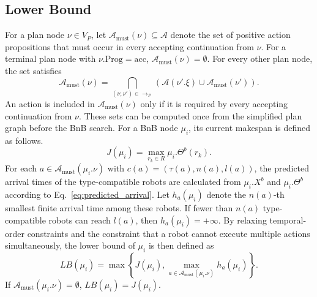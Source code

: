 \documentclass[lettersize,journal]{IEEEtran}
\theoremstyle{italiclemma}
\theoremstyle{italiclemma}
\theoremstyle{definition}
\begin{document}

\subsection{Lower Bound}

For a plan node $\nu\in V_P$, let
$\mathcal A_{\mathrm{must}}(\nu)\subseteq\mathcal A$ denote the set of positive action propositions that must occur in every accepting continuation from $\nu$. For a terminal plan node with $\nu.\mathrm{Prog}=\mathrm{acc}$,
$\mathcal A_{\mathrm{must}}(\nu)=\emptyset$. For every other plan node, the set satisfies
\begin{equation}
\mathcal A_{\mathrm{must}}(\nu) =
\bigcap_{(\nu,\nu')\in \rightarrow_P}
\left( \mathcal A(\nu'.\xi) \cup \mathcal A_{\mathrm{must}}(\nu') \right).
\label{eq:must_actions}
\end{equation}
An action is included in $\mathcal A_{\mathrm{must}}(\nu)$ only if it is required by every accepting continuation from $\nu$. These sets can be computed once from the simplified plan graph before the BnB search. For a BnB node $\mu_i$, its current makespan is defined as follows.
\begin{equation}
J(\mu_i)
=
\max_{r_k\in R}\mu_i.\Theta^b(r_k).
\label{eq:bnb_current_cost}
\end{equation}
For each $a\in\mathcal A_{\mathrm{must}}(\mu_i.\nu)$ with
$c(a)=(\tau(a),n(a),l(a))$, the predicted arrival times of the type-compatible robots are calculated from
$\mu_i.X^b$ and $\mu_i.\Theta^b$ according to
Eq.~\eqref{eq:predicted_arrival}. Let $h_a(\mu_i)$ denote the $n(a)$-th smallest finite arrival time among these robots. If fewer than $n(a)$ type-compatible robots can reach $l(a)$, then $h_a(\mu_i)=+\infty$. By relaxing temporal-order constraints and the constraint that a robot cannot execute multiple actions simultaneously, the lower bound of $\mu_i$ is then defined as
\begin{equation}
LB(\mu_i)
=
\max
\left\{
J(\mu_i),
\max_{a\in\mathcal A_{\mathrm{must}}(\mu_i.\nu)}
h_a(\mu_i)
\right\}.
\label{eq:bnb_lower_bound}
\end{equation}
If $\mathcal A_{\mathrm{must}}(\mu_i.\nu)=\emptyset$, $LB(\mu_i)=J(\mu_i)$.
\end{document}
